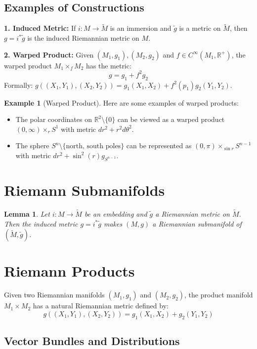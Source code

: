 \documentclass[11pt, a4paper]{article}
\theoremstyle{plain}
\newtheorem{lemma}[theorem]{Lemma}
\theoremstyle{definition}
\newtheorem{example}[theorem]{Example}
\theoremstyle{remark}
\begin{document}
\subsection{Examples of Constructions}

\textbf{1. Induced Metric:} If $i: M \to \tilde{M}$ is an immersion and $\tilde{g}$ is a metric on $\tilde{M}$, then $g = i^* \tilde{g}$ is the induced Riemannian metric on $M$.

\noindent\textbf{2. Warped Product:} Given $(M_1, g_1), (M_2, g_2)$ and $f \in C^\infty(M_1, \mathbb{R}^+)$, the warped product $M_1 \times_f M_2$ has the metric:
\[ g = g_1 + f^2 g_2 \]
Formally: $g((X_1, Y_1), (X_2, Y_2)) = g_1(X_1, X_2) + f^2(p_1) g_2(Y_1, Y_2)$.

\begin{example}[Warped Product]
    Here are some examples of warped products:
    \begin{itemize}
        \item The polar coordinates on $\mathbb{R}^2 \setminus \{0\}$ can be viewed as a warped product $(0, \infty) \times_r S^1$ with metric $dr^2 + r^2 d\theta^2$.
        \item The sphere $S^n \setminus \{\text{north, south poles}\}$ can be represented as $(0, \pi) \times_{\sin r} S^{n-1}$ with metric $dr^2 + \sin^2(r) g_{S^{n-1}}$.
    \end{itemize}
\end{example}

\section*{Riemann Submanifolds}
\begin{lemma}
Let $i: M \to \tilde{M}$ be an embedding and $\tilde{g}$ a Riemannian metric on $\tilde{M}$. Then the induced metric $g = i^* \tilde{g}$ makes $(M, g)$ a Riemannian submanifold of $(\tilde{M}, \tilde{g})$.
\end{lemma}

\section*{Riemann Products}
Given two Riemannian manifolds $(M_1, g_1)$ and $(M_2, g_2)$, the product manifold $M_1 \times M_2$ has a natural Riemannian metric defined by:
\[ g((X_1, Y_1), (X_2, Y_2)) = g_1(X_1, X_2) + g_2(Y_1, Y_2) \]

\subsection{Vector Bundles and Distributions}
\end{document}
